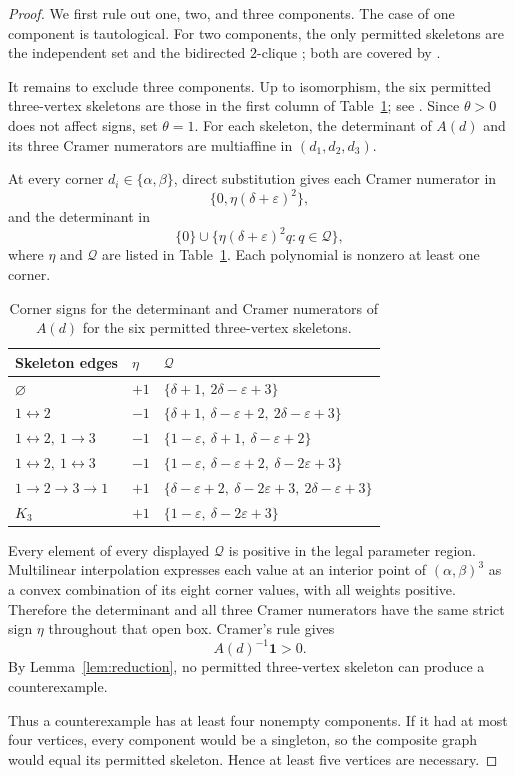 \documentclass[11pt]{amsart}
\newcommand{\one}{\mathbf{1}}
\newcommand{\eps}{\varepsilon}
\begin{document}
\begin{proof}
We first rule out one, two, and three components. The case of one
component is tautological. For two components, the only permitted
skeletons are the independent set and the bidirected $2$-clique
\cite[Figure~18]{CGM}; both are covered by \cite[Theorem~5.7]{CGM}.

It remains to exclude three components. Up to isomorphism, the six
permitted three-vertex skeletons are those in the first column of
Table~\ref{tab:corners}; see \cite[Figure~18]{CGM}. Since $\theta>0$
does not affect signs, set $\theta=1$. For each skeleton, the determinant
of $A(d)$ and its three Cramer numerators are multiaffine in
$(d_1,d_2,d_3)$.

At every corner $d_i\in\{\alpha,\beta\}$, direct substitution gives each
Cramer numerator in
\[
\{0,\eta(\delta+\eps)^2\},
\]
and the determinant in
\[
\{0\}\cup
\{\eta(\delta+\eps)^2q:q\in\mathcal Q\},
\]
where $\eta$ and $\mathcal Q$ are listed in Table~\ref{tab:corners}.
Each polynomial is nonzero at least one corner.

\begin{table}[t]
\centering
\small
\begin{tabular}{@{}lll@{}}
\toprule
Skeleton edges & $\eta$ & $\mathcal Q$\\
\midrule
$\varnothing$
& $+1$
& $\{\delta+1,\ 2\delta-\eps+3\}$\\
$1\leftrightarrow2$
& $-1$
& $\{\delta+1,\ \delta-\eps+2,\ 2\delta-\eps+3\}$\\
$1\leftrightarrow2,\ 1\to3$
& $-1$
& $\{1-\eps,\ \delta+1,\ \delta-\eps+2\}$\\
$1\leftrightarrow2,\ 1\leftrightarrow3$
& $-1$
& $\{1-\eps,\ \delta-\eps+2,\ \delta-2\eps+3\}$\\
$1\to2\to3\to1$
& $+1$
& $\{\delta-\eps+2,\ \delta-2\eps+3,\
2\delta-\eps+3\}$\\
$K_3$
& $+1$
& $\{1-\eps,\ \delta-2\eps+3\}$\\
\bottomrule
\end{tabular}
\caption{Corner signs for the determinant and Cramer numerators of
$A(d)$ for the six permitted three-vertex skeletons.}
\label{tab:corners}
\end{table}

Every element of every displayed $\mathcal Q$ is positive in the legal
parameter region. Multilinear interpolation expresses each value at an
interior point of $(\alpha,\beta)^3$ as a convex combination of its eight
corner values, with all weights positive. Therefore the determinant and
all three Cramer numerators have the same strict sign $\eta$ throughout
that open box. Cramer's rule gives
\[
A(d)^{-1}\one>0.
\]
By Lemma~\ref{lem:reduction}, no permitted three-vertex skeleton can
produce a counterexample.

Thus a counterexample has at least four nonempty components. If it had
at most four vertices, every component would be a singleton, so the
composite graph would equal its permitted skeleton. Hence at least five
vertices are necessary.
\end{proof}
\end{document}
